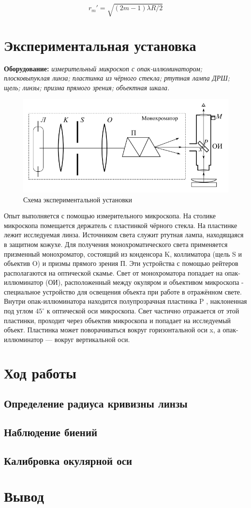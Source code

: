 \begin{equation}
    r_m' = \sqrt{(2m - 1)\lambda R/ 2}
\end{equation}

\newpage
\section*{Экспериментальная установка}
\textbf{Оборудование:} \textit{измерительный микроскоп с опак-иллюминатором; плосковыпуклая линза; пластинка из чёрного стекла;
ртутная лампа ДРШ; щель; линзы; призма прямого зрения; объектная шкала.}

\begin{figure}[h!]
    \centering
    \includegraphics[width=12cm]{images/setup.png}
    \caption{Схема экспериментальной установки}
\end{figure}

Опыт выполняется с помощью измерительного микроскопа. На столике микроскопа  
помещается держатель с пластинкой чёрного стекла. На пластинке лежит 
исследуемая линза.
Источником света служит ртутная лампа, находящаяся в защитном кожухе. Для получения монохроматического света применяется
призменный монохроматор, состоящий из конденсора K, коллиматора (щель S и объектив O) и призмы прямого зрения П. Эти устройства с помощью рейтеров располагаются на оптической скамье. Свет от
монохроматора попадает на опак-иллюминатор (ОИ), расположенный
между окуляром и объективом микроскопа - специальное устройство
для освещения объекта при работе в отражённом свете. Внутри опак-иллюминатора находится полупрозрачная пластинка P , наклоненная
под углом $45^{\circ}$ к оптической оси микроскопа. Свет частично отражается от этой пластинки, проходит через объектив микроскопа и попадает
на исследуемый объект. Пластинка может поворачиваться вокруг горизонтальной оси x, а опак-иллюминатор — вокруг вертикальной оси.


\section*{Ход работы}
\subsection*{Определение радиуса кривизны линзы}
\subsection*{Наблюдение биений}
\subsection*{Калибровка окулярной оси}

\section*{Вывод}





